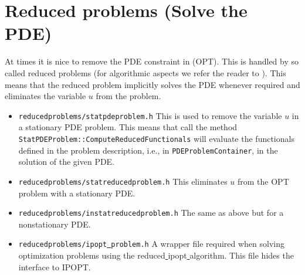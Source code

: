 \section{Reduced problems (Solve the PDE)}
At times it is nice to remove the PDE constraint in (OPT). 
This is handled by so called reduced 
problems (for algorithmic aspects we refer the reader to 
\cite{BeMeVe06}). 
This means that the reduced problem implicitly solves the PDE whenever required
and eliminates the variable $u$ from the problem.
\begin{itemize}
\item \texttt{reducedproblems/statpdeproblem.h} This is used to remove the variable $u$ in 
  a stationary PDE problem. This means that call the method \\
  \texttt{StatPDEProblem::ComputeReducedFunctionals} will evaluate the functionals 
  defined in the problem description, i.e., in \texttt{PDEProblemContainer}, in the 
  solution of the given PDE.
\item \texttt{reducedproblems/statreducedproblem.h} This eliminates $u$ from the OPT
  problem with a stationary PDE.
\item \texttt{reducedproblems/instatreducedproblem.h} The same as above but for a
  nonstationary PDE.
\item \texttt{reducedproblems/ipopt\underline{ }problem.h} A wrapper file 
 required when solving optimization problems using the 
  reduced\underline{ }ipopt\underline{ }algorithm. This file
  hides the interface to IPOPT.
\end{itemize}

